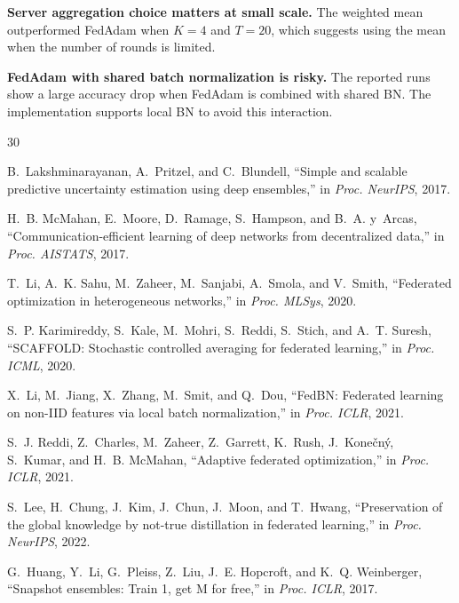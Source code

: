 \documentclass[journal,twoside]{IEEEtran}
\begin{document}
\textbf{Server aggregation choice matters at small scale.} The weighted
mean outperformed FedAdam when $K=4$ and $T=20$, which suggests using the
mean when the number of rounds is limited.

\textbf{FedAdam with shared batch normalization is risky.} The reported
runs show a large accuracy drop when FedAdam is combined with shared BN.
The implementation supports local BN to avoid this interaction.

\balance

\begin{thebibliography}{30}

B.~Lakshminarayanan, A.~Pritzel, and C.~Blundell,
``Simple and scalable predictive uncertainty estimation using deep
ensembles,''
in \emph{Proc. NeurIPS}, 2017.

H.~B. McMahan, E.~Moore, D.~Ramage, S.~Hampson, and B.~A. y~Arcas,
``Communication-efficient learning of deep networks from decentralized
data,''
in \emph{Proc. AISTATS}, 2017.

T.~Li, A.~K. Sahu, M.~Zaheer, M.~Sanjabi, A.~Smola, and V.~Smith,
``Federated optimization in heterogeneous networks,''
in \emph{Proc. MLSys}, 2020.

S.~P. Karimireddy, S.~Kale, M.~Mohri, S.~Reddi, S.~Stich, and
A.~T. Suresh,
``{SCAFFOLD}: Stochastic controlled averaging for federated learning,''
in \emph{Proc. ICML}, 2020.

X.~Li, M.~Jiang, X.~Zhang, M.~Smit, and Q.~Dou,
``{FedBN}: Federated learning on non-{IID} features via local batch
normalization,''
in \emph{Proc. ICLR}, 2021.

S.~J. Reddi, Z.~Charles, M.~Zaheer, Z.~Garrett, K.~Rush,
J.~Kone\v{c}n\'{y}, S.~Kumar, and H.~B. McMahan,
``Adaptive federated optimization,''
in \emph{Proc. ICLR}, 2021.

S.~Lee, H.~Chung, J.~Kim, J.~Chun, J.~Moon, and T.~Hwang,
``Preservation of the global knowledge by not-true distillation in
federated learning,''
in \emph{Proc. NeurIPS}, 2022.

G.~Huang, Y.~Li, G.~Pleiss, Z.~Liu, J.~E. Hopcroft, and
K.~Q. Weinberger,
``Snapshot ensembles: Train 1, get {M} for free,''
in \emph{Proc. ICLR}, 2017.


\end{thebibliography}
\end{document}
